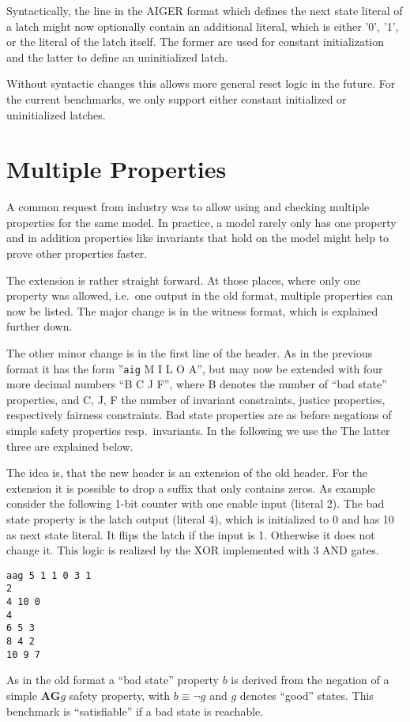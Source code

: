 \documentclass{llncs}
\begin{document}
Syntactically, the line in the AIGER format which defines the next state
literal of a latch might now optionally contain an additional literal, which
is either '0', '1', or the literal of the latch itself.  The former are used
for constant initialization and the latter to define an uninitialized latch.

Without syntactic changes this allows more general reset logic in the
future.  For the current benchmarks, we only support either constant
initialized or uninitialized latches.

\section{Multiple Properties}

A common request from industry was to allow using and checking multiple
properties for the same model.  In practice, a model rarely only has one
property and in addition properties like invariants that hold on the model
might help to prove other properties faster.

The extension is rather straight forward.  At those places,
where only one property was allowed,
i.e.~one output in the old format, multiple properties can now be listed.
The major change is in the witness format, which is explained further down.

The other minor change is in the first line of the header.  As in the previous
format it has the form ''\texttt{aig} M I L O A'', but may now be
extended with four more decimal numbers ``B C J F'', where B denotes the
number of ``bad state'' properties, and C, J, F the number of
invariant constraints, justice properties, respectively fairness
constraints.  Bad state properties
are as before negations of simple safety properties resp.~invariants.
In the following we use the The latter three are explained below.

The idea is, that the new header is an extension of the old header.
For the extension it is possible to drop a suffix that only contains
zeros.  As example consider the following 1-bit counter with one enable
input (literal 2).  The bad state property is the latch output (literal 4),
which is initialized to 0 and has 10 as next state literal.  It flips the
latch if the input is 1.  Otherwise it does not change it.  This logic is
realized by the XOR implemented with 3 AND gates.
{\small
\begin{verbatim}
aag 5 1 1 0 3 1
2
4 10 0
4
6 5 3
8 4 2
10 9 7
\end{verbatim}}
As in the old format a ``bad state'' property $b$ is derived from the negation
of a simple $\mathrel{\mathbf{A}} \mathrel{\mathbf{G}} g$ safety property,
with $b \equiv \neg g$ and $g$ denotes ``good'' states.  This benchmark is
``satisfiable'' if a bad state is reachable.
\end{document}
